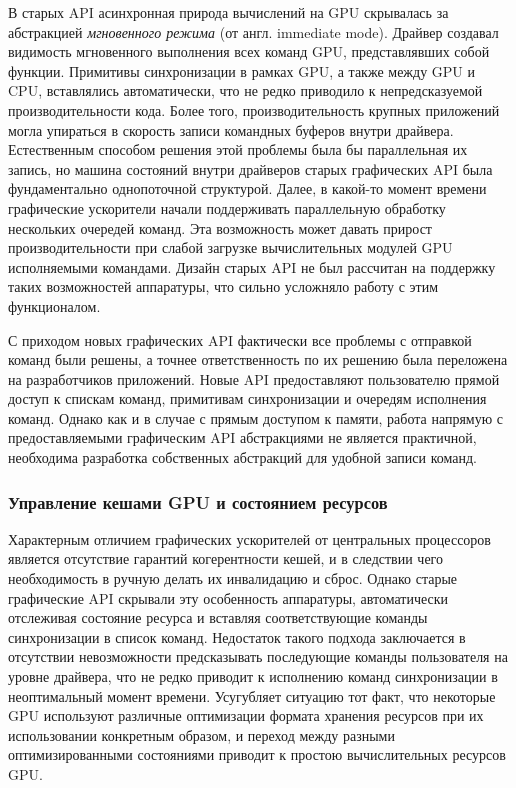 В старых API асинхронная природа вычислений на GPU скрывалась за абстракцией \textit{мгновенного режима} (от англ. immediate mode).
Драйвер создавал видимость мгновенного выполнения всех команд GPU, представлявших собой функции.
Примитивы синхронизации в рамках GPU, а также между GPU и CPU, вставлялись автоматически, что не редко приводило к непредсказуемой производительности кода.
Более того, производительность крупных приложений могла упираться в скорость записи командных буферов внутри драйвера.
Естественным способом решения этой проблемы была бы параллельная их запись, но машина состояний внутри драйверов старых графических API была фундаментально однопоточной структурой.
Далее, в какой-то момент времени графические ускорители начали поддерживать параллельную обработку нескольких очередей команд.
Эта возможность может давать прирост производительности при слабой загрузке вычислительных модулей GPU исполняемыми командами.
Дизайн старых API не был рассчитан на поддержку таких возможностей аппаратуры, что сильно усложняло работу с этим функционалом.

С приходом новых графических API фактически все проблемы с отправкой команд были решены, а точнее ответственность по их решению была переложена на разработчиков приложений.
Новые API предоставляют пользователю прямой доступ к спискам команд, примитивам синхронизации и очередям исполнения команд.
Однако как и в случае с прямым доступом к памяти, работа напрямую с предоставляемыми графическим API абстракциями не является практичной, необходима разработка собственных абстракций для удобной записи команд.

\subsubsection{Управление кешами GPU и состоянием ресурсов}
Характерным отличием графических ускорителей от центральных процессоров является отсутствие гарантий когерентности кешей, и в следствии чего необходимость в ручную делать их инвалидацию и сброс.
Однако старые графические API скрывали эту особенность аппаратуры, автоматически отслеживая состояние ресурса и вставляя соответствующие команды синхронизации в список команд.
Недостаток такого подхода заключается в отсутствии невозможности предсказывать последующие команды пользователя на уровне драйвера, что не редко приводит к исполнению команд синхронизации в неоптимальный момент времени.
Усугубляет ситуацию тот факт, что некоторые GPU используют различные оптимизации формата хранения ресурсов при их использовании конкретным образом, и переход между разными оптимизированными состояниями приводит к простою вычислительных ресурсов GPU.

